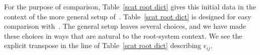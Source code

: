 \documentclass[10pt,a4paper]{amsart}
\theoremstyle{definition}
\DeclareMathOperator{\uf}{uf}
\DeclareMathOperator{\Hom}{Hom}
\newcommand{\integers}{\mathbb Z}
\newcommand{\rationals}{\mathbb Q}
\newcommand{\set}[1]{{\left\lbrace #1 \right\rbrace}}
\newcommand{\br}[1]{{\langle #1 \rangle}}
\newcommand{\ck}{\spcheck}
\newcommand{\s}{\mathbf{s}}
\begin{document}
For the purpose of comparison, Table~\ref{scat root dict} gives this initial data in the context of the more general setup of~\cite{GHKK}.
Table~\ref{scat root dict} is designed for easy comparison with~\cite[Table~1]{scatfan}. 
The general setup leaves several choices, and we have made these choices in ways that are natural to the root-system context. 
We see the explicit transpose in the line of Table~\ref{scat root dict} describing $\epsilon_{ij}$.
\end{document}
